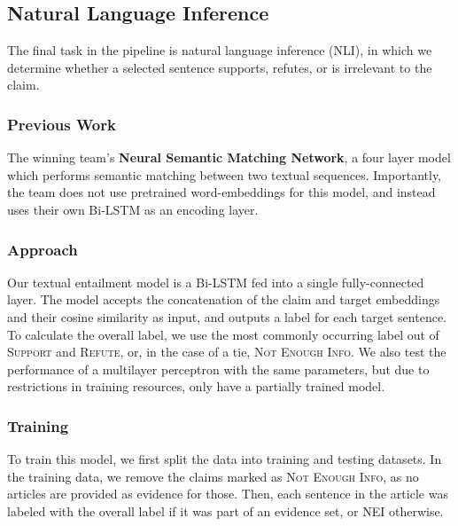 \documentclass[11pt,a4paper]{article}
\begin{document}
\subsection{Natural Language Inference}

The final task in the pipeline is natural language inference (NLI), in which we determine
whether a selected sentence supports, refutes, or is irrelevant to the claim.

\subsubsection{Previous Work}%
\label{subsec:nli-prev-work}

The winning team's \textbf{Neural Semantic Matching Network}, a four layer model
\footnotemark which performs semantic matching between two textual sequences.
Importantly, the team does not use pretrained word-embeddings for this model,
and instead uses their own Bi-LSTM as an encoding layer.


\subsubsection{Approach}%
\label{subsec:nli-approach}

Our textual entailment model is a Bi-LSTM fed into a single fully-connected
layer. The model accepts the concatenation of the claim and target embeddings and
their cosine similarity as input, and outputs a label for each target sentence.
To calculate the overall label, we use the most commonly occurring label out of
\textsc{Support} and \textsc{Refute}, or, in the case of a tie, \textsc{Not
  Enough Info}. We also test the performance of a multilayer perceptron with the
same parameters, but due to restrictions in training resources, only have a
partially trained model.

\subsubsection{Training}
\label{subsec:nli-training}

To train this model, we first split the data into training and testing datasets.
In the training data, we remove the claims marked as \textsc{Not Enough Info},
as no articles are provided as evidence for those\footnotemark. Then, each
sentence in the article was labeled with the overall label if it was part of an
evidence set, or NEI otherwise.
\end{document}
